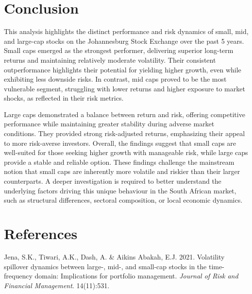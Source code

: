 \documentclass[12pt,preprint]{elsarticle}
\numberwithin{equation}{section}
\numberwithin{figure}{section}
\numberwithin{table}{section}
\newlength{\cslhangindent}
\newenvironment{CSLReferences}[2] %
{\begin{list}{}{%
	\setlength{\itemindent}{0pt}
	\setlength{\leftmargin}{0pt}
	\setlength{\parsep}{0pt}
	\ifodd #1
	\setlength{\leftmargin}{\cslhangindent}
	\setlength{\itemindent}{-1\cslhangindent}
	\fi
	\setlength{\itemsep}{#2\baselineskip}}}
{\end{list}}
\begin{document}
\section{Conclusion}\label{conclusion}

This analysis highlights the distinct performance and risk dynamics of
small, mid, and large-cap stocks on the Johannesburg Stock Exchange over
the past 5 years. Small caps emerged as the strongest performer,
delivering superior long-term returns and maintaining relatively
moderate volatility. Their consistent outperformance highlights their
potential for yielding higher growth, even while exhibiting less
downside risks. In contrast, mid caps proved to be the most vulnerable
segment, struggling with lower returns and higher exposure to market
shocks, as reflected in their risk metrics.

Large caps demonstrated a balance between return and risk, offering
competitive performance while maintaining greater stability during
adverse market conditions. They provided strong risk-adjusted returns,
emphasizing their appeal to more risk-averse investors. Overall, the
findings suggest that small caps are well-suited for those seeking
higher growth with manageable risk, while large caps provide a stable
and reliable option. These findings challenge the mainstream notion that
small caps are inherently more volatile and riskier than their larger
counterparts. A deeper investigation is required to better understand
the underlying factors driving this unique behaviour in the South
African market, such as structural differences, sectoral composition, or
local economic dynamics.

\newpage

\section*{References}\label{references}

\label{refs}
\begin{CSLReferences}{1}{1}
Jena, S.K., Tiwari, A.K., Dash, A. \& Aikins Abakah, E.J. 2021.
Volatility spillover dynamics between large-, mid-, and small-cap stocks
in the time-frequency domain: Implications for portfolio management.
\emph{Journal of Risk and Financial Management}. 14(11):531.

\end{CSLReferences}


\end{document}
